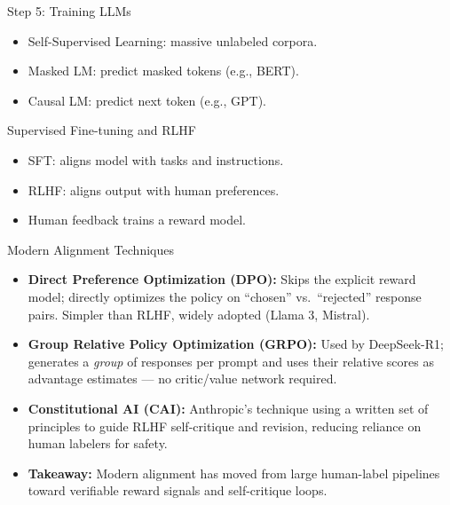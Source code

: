 \documentclass{beamer}       %
\begin{document}
\begin{frame}{Step 5: Training LLMs}
  \begin{itemize}
    \item Self-Supervised Learning: massive unlabeled corpora.
    \item Masked LM: predict masked tokens (e.g., BERT).
    \item Causal LM: predict next token (e.g., GPT).
  \end{itemize}
\end{frame}

\begin{frame}{Supervised Fine-tuning and RLHF}
  \begin{itemize}
    \item SFT: aligns model with tasks and instructions.
    \item RLHF: aligns output with human preferences.
    \item Human feedback trains a reward model.
  \end{itemize}
\end{frame}

\begin{frame}{Modern Alignment Techniques}
    \begin{itemize}
        \item \textbf{Direct Preference Optimization (DPO):} Skips the explicit reward model; directly optimizes the policy on ``chosen'' vs.\ ``rejected'' response pairs. Simpler than RLHF, widely adopted (Llama 3, Mistral).
        \item \textbf{Group Relative Policy Optimization (GRPO):} Used by DeepSeek-R1; generates a \emph{group} of responses per prompt and uses their relative scores as advantage estimates --- no critic/value network required.
        \item \textbf{Constitutional AI (CAI):} Anthropic's technique using a written set of principles to guide RLHF self-critique and revision, reducing reliance on human labelers for safety.
        \item \textbf{Takeaway:} Modern alignment has moved from large human-label pipelines toward verifiable reward signals and self-critique loops.
    \end{itemize}
\end{frame}
\end{document}
